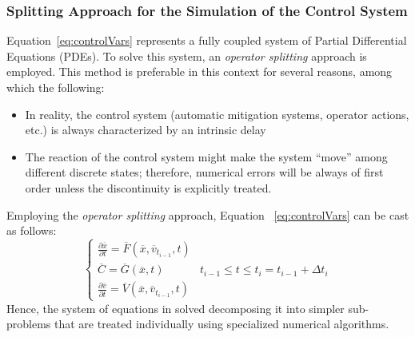 \subsubsection{Splitting Approach for the Simulation of the Control System}
Equation~\ref{eq:controlVars} represents a fully coupled system of Partial Differential
Equations (PDEs). To solve this system, an  \textit{operator splitting} approach
is employed. This method is preferable in this context for several reasons, among which the following:
\begin{itemize}
  \item In reality, the control system (automatic mitigation systems, operator actions,
  etc.) is always characterized by an intrinsic delay
  \item The reaction of the control system might make the system ``move'' among
  different discrete states; therefore, numerical errors will be always of first order
  unless the discontinuity is explicitly treated.
\end{itemize}
Employing the \textit{operator splitting} approach, Equation ~\ref{eq:controlVars}  can be
cast as follows:
\begin{equation}
\label{eq:operatorSplitting}
\left\{\begin{matrix}
\frac{\partial \overline{x} }{\partial t} = \overline{F}\left (  \overline{x},\overline{v}_{t_{i-1}}, t \right )  & \\
\overline{C} =  \overline{G}(\overline{x},t)  & t_{i-1} \leq t \leq  t_{i} =  t_{i-1} + \Delta  t_{i}\\
\frac{\partial \overline{v} }{\partial t} = \overline{V}\left (  \overline{x}, \overline{v}_{t_{i-1}}, t \right ) &
\end{matrix}\right.
\end{equation}
Hence, the system of equations in solved decomposing it into simpler sub-problems that are treated individually
using specialized numerical algorithms.

